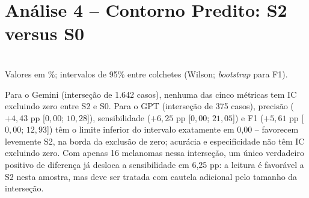 \section{Análise 4 -- Contorno Predito: S2 versus S0}
\label{sec:resultados_analise4}

\begin{table}[H]
	\centering
	\caption{Análise 4 -- multiagente em S2 versus S0, por modelo, 3.000 lesões.}
	\label{tab:analise4}
	\\ \footnotesize Valores em \%; intervalos de 95\% entre colchetes (Wilson; \textit{bootstrap} para F1).
\end{table}

Para o Gemini (interseção de 1.642 casos), nenhuma das cinco métricas tem IC excluindo zero entre S2 e S0. Para o GPT (interseção de 375 casos), precisão ($+4,43$ pp [$0,00$; $10,28$]), sensibilidade ($+6,25$ pp [$0,00$; $21,05$]) e F1 ($+5,61$ pp [$0,00$; $12,93$]) têm o limite inferior do intervalo exatamente em 0,00 -- favorecem levemente S2, na borda da exclusão de zero; acurácia e especificidade não têm IC excluindo zero. Com apenas 16 melanomas nessa interseção, um único verdadeiro positivo de diferença já desloca a sensibilidade em 6,25 pp: a leitura é favorável a S2 nesta amostra, mas deve ser tratada com cautela adicional pelo tamanho da interseção.

